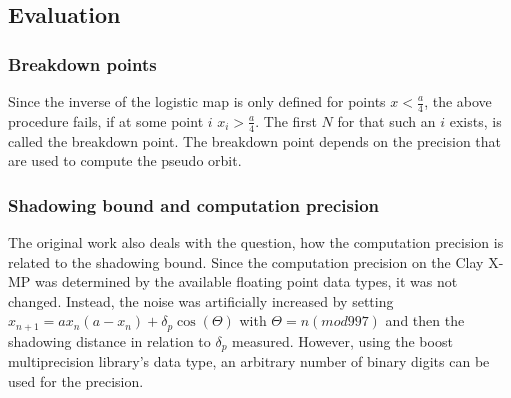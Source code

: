 \subsection{Evaluation}
  \subsubsection{Breakdown points}
  Since the inverse of the logistic map is only defined for points $x < \frac{a}{4}$, the above procedure fails, if at some point $i$ $x_i > \frac{a}{4}$. The first $N$ for that such an $i$ exists, is called the breakdown point.
  The breakdown point depends on the precision that are used to compute the pseudo orbit. 
  \subsubsection{Shadowing bound and computation precision}
  The original work also deals with the question, how the computation precision is related to the shadowing bound. 
  Since the computation precision on the Clay X-MP was determined by the available floating point data types, it was not changed. Instead, the noise was artificially increased by setting $x_{n+1} = ax_n(a-x_n)+\delta_p \cos (\Theta)$ with $\Theta = n (mod 997)$ and then the shadowing distance in relation to $\delta_p$ measured.
  However, using the boost multiprecision library's  data type, an arbitrary number of binary digits can be used for the precision.

